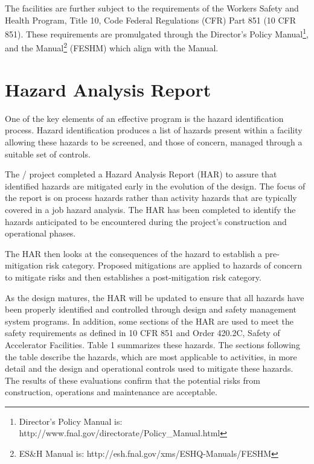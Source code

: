 The \fnal facilities are further subject to the requirements of the
 Workers Safety and Health Program, Title 10, Code Federal
Regulations (CFR) Part 851 (10 CFR 851).  These requirements are
promulgated through the \fnal Director's Policy Manual\footnote{\fnal
  Director's Policy Manual is:
  http://www.fnal.gov/directorate/Policy\_Manual.html}, and the \fnal
{} Manual\footnote{\fnal ES\&H Manual is:
  http://esh.fnal.gov/xms/ESHQ-Manuals/FESHM} (FESHM) which align with
the \surf {} Manual.

\section{Hazard Analysis Report}

One of the key elements of an effective  program is the hazard
identification process. Hazard identification produces a list of
hazards present within a facility allowing these hazards to be
screened, and those of concern, managed through a suitable set of
controls.

The / project completed a Hazard Analysis Report (HAR) to
assure that identified hazards are mitigated early in the evolution of
the design.  The focus of the report is on process hazards rather than
activity hazards that are typically covered in a job hazard analysis.
The HAR has been completed to identify the hazards anticipated to be
encountered during the project's construction and operational phases.

The HAR then looks at the consequences of the hazard to establish a
pre-mitigation risk category. Proposed mitigations are applied to
hazards of concern to mitigate risks and then establishes a
post-mitigation risk category.

As the  design matures, the HAR will be updated to ensure that all
hazards have been properly identified and controlled through design
and safety management system programs.  In addition, some sections of
the HAR are used to meet the safety requirements as defined in 10 CFR
851 and  Order 420.2C, Safety of Accelerator Facilities.  Table 1
summarizes these hazards.  The sections following the table describe
the hazards, which are most applicable to  activities, in more
detail and the design and operational controls used to mitigate these
hazards. The results of these evaluations confirm that the potential
risks from construction, operations and maintenance are acceptable.

